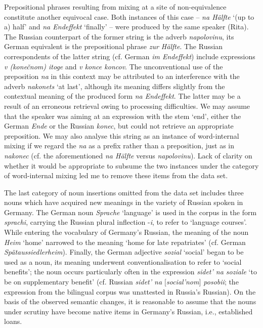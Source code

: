 Prepositional phrases resulting from mixing at a site of non-equivalence constitute another equivocal case. Both instances of this case -- \textit{na Hälfte} `(up to a) half' and \textit{na Endeffekt} `finally' -- were produced by the same speaker (Rita). The Russian counterpart of the former string is the adverb \textit{napolovinu}, its German equivalent is the prepositional phrase \textit{zur Hälfte}. The Russian correspondents of the latter string (cf. German \textit{im Endeffekt}) include expressions \textit{v (konečnom) itoge} and \textit{v konce koncov}. The unconventional use of the preposition \textit{na} in this context may be attributed to an interference with the adverb \textit{nakonets} `at last', although its meaning differs slightly from the contextual meaning of the produced form \textit{na Endeffekt}. The latter may be a result of an erroneous retrieval owing to processing difficulties. We may assume that the speaker was aiming at an expression with the stem `end', either the German \textit{Ende} or the Russian \textit{konec}, but could not retrieve an appropriate preposition. We may also analyse this string as an instance of word-internal mixing if we regard the \textit{na} as a prefix rather than a preposition, just as in \textit{nakonec} (cf. the aforementioned \textit{na Hälfte} versus \textit{napolovinu}). Lack of clarity on whether it would be appropriate to subsume the two instances under the category of word-internal mixing led me to remove these items from the data set. 

The last category of noun insertions omitted from the data set includes three nouns which have acquired new meanings in the variety of Russian spoken in Germany. The German noun \textit{Sprache} `language' is used in the corpus in the form \textit{sprachi}, carrying the Russian plural inflection -\textit{i}, to refer to `language courses'. While entering the vocabulary of Germany's Russian, the meaning of the noun \textit{Heim} `home' narrowed to the meaning `home for late repatriates' (cf. German \textit{Spätaussiedlerheim}). Finally, the German adjective \textit{sozial} `social' began to be used as a noun, its meaning underwent conventionalisation to refer to `social benefits'; the noun occurs particularly often in the expression \textit{sidet' na soziale} `to be on supplementary benefit' (cf. Russian \textit{sidet' na $[$social'nom$]$ posobii}; the expression from the bilingual corpus was unattested in Russia's  Russian). On the basis of the observed semantic changes, it is reasonable to assume that the nouns under scrutiny have become native items in Germany's Russian, i.e., established loans. 

